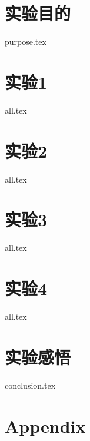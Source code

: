 \documentclass{apmcmthesis}
\begin{document}
\pagestyle{frontmatterstyle}




\newpage
\tableofcontents


\newpage
\pagestyle{mainmatterstyle}
\setcounter{page}{1}


\section{实验目的}
{purpose.tex}


\section{实验1}
{all.tex}


\section{实验2}
{all.tex}

\section{实验3}
{all.tex}

\section{实验4}
{all.tex}


\section{实验感悟}
{conclusion.tex}

\newpage

\section{Appendix}
\end{document}
